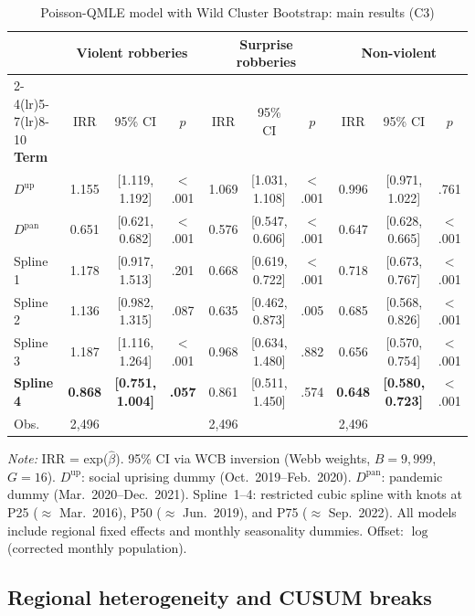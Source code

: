 \documentclass[pdflatex,sn-basic]{sn-jnl}
\newcommand{\tablenote}[1]{%
  \vspace{2pt}\par
  {\footnotesize\textit{Note:} #1\par}
}
\begin{document}
\begin{table}[htbp]
\centering
\caption{Poisson-QMLE model with Wild Cluster Bootstrap: main results (C3)}
\label{tab:poisson}
\footnotesize
\begin{tabular}{l@{\hskip 3mm}ccc@{\hskip 4mm}ccc@{\hskip 4mm}ccc}
\toprule
 & \multicolumn{3}{c}{\textbf{Violent robberies}} & \multicolumn{3}{c}{\textbf{Surprise robberies}} & \multicolumn{3}{c}{\textbf{Non-violent}} \\
\cmidrule(lr){2-4}\cmidrule(lr){5-7}\cmidrule(lr){8-10}
\textbf{Term} & IRR & 95\% CI & $p$ & IRR & 95\% CI & $p$ & IRR & 95\% CI & $p$ \\
\midrule
$D^{\text{up}}$ & 1.155 & [1.119, 1.192] & $<$.001 & 1.069 & [1.031, 1.108] & $<$.001 & 0.996 & [0.971, 1.022] & .761 \\
$D^{\text{pan}}$ & 0.651 & [0.621, 0.682] & $<$.001 & 0.576 & [0.547, 0.606] & $<$.001 & 0.647 & [0.628, 0.665] & $<$.001 \\
\midrule
Spline 1    & 1.178 & [0.917, 1.513] & .201 & 0.668 & [0.619, 0.722] & $<$.001 & 0.718 & [0.673, 0.767] & $<$.001 \\
Spline 2    & 1.136 & [0.982, 1.315] & .087 & 0.635 & [0.462, 0.873] & .005 & 0.685 & [0.568, 0.826] & $<$.001 \\
Spline 3    & 1.187 & [1.116, 1.264] & $<$.001 & 0.968 & [0.634, 1.480] & .882 & 0.656 & [0.570, 0.754] & $<$.001 \\
\textbf{Spline 4} & \textbf{0.868} & \textbf{[0.751, 1.004]} & \textbf{.057} & 0.861 & [0.511, 1.450] & .574 & \textbf{0.648} & \textbf{[0.580, 0.723]} & $<$.001 \\
\midrule
Obs. & 2,496 & & & 2,496 & & & 2,496 & & \\
\bottomrule
\end{tabular}
\tablenote{IRR = exp($\hat{\beta}$). 95\% CI via WCB inversion (Webb weights,
$B=9,999$, $G=16$). $D^{\text{up}}$: social uprising dummy (Oct.\ 2019--Feb.\
2020). $D^{\text{pan}}$: pandemic dummy (Mar.\ 2020--Dec.\ 2021). Spline~1--4: restricted
cubic spline with knots at P25 ($\approx$ Mar.\ 2016), P50 ($\approx$ Jun.\ 2019),
and P75 ($\approx$ Sep.\ 2022). All models include regional fixed effects and
monthly seasonality dummies. Offset: $\log$(corrected monthly population).}
\end{table}

\subsection{Regional heterogeneity and CUSUM breaks}
\label{sub:regional}
\end{document}
